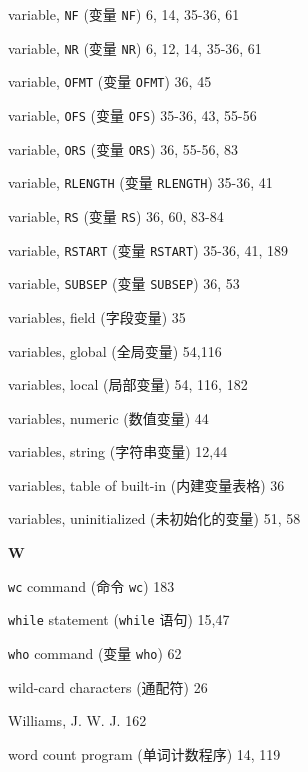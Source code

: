 \begin{multicols}{2}
\hangindent=2pc  variable, \verb'NF' (变量 \verb'NF')
6, 14, 35-36, 61

\hangindent=2pc  variable, \verb'NR' (变量 \verb'NR')
6, 12, 14, 35-36, 61

\hangindent=2pc  variable, \verb'OFMT' (变量 \verb'OFMT') 36, 45

\hangindent=2pc  variable, \verb'OFS' (变量 \verb'OFS')
35-36, 43, 55-56

\hangindent=2pc  variable, \verb'ORS' (变量 \verb'ORS') 36, 55-56, 83

\hangindent=2pc  variable, \verb'RLENGTH' (变量 \verb'RLENGTH')
35-36, 41

\hangindent=2pc  variable, \verb'RS' (变量 \verb'RS') 36, 60, 83-84

\hangindent=2pc  variable, \verb'RSTART' (变量 \verb'RSTART')
35-36, 41, 189

\hangindent=2pc  variable, \verb'SUBSEP' (变量 \verb'SUBSEP') 36, 53

\hangindent=2pc  variables, field (字段变量) 35

\hangindent=2pc  variables, global (全局变量) 54,116

\hangindent=2pc  variables, local (局部变量) 54, 116, 182

\hangindent=2pc  variables, numeric (数值变量) 44

\hangindent=2pc  variables, string (字符串变量) 12,44

\hangindent=2pc  variables, table of built-in (内建变量表格) 36

\hangindent=2pc  variables, uninitialized (未初始化的变量) 51, 58

\medskip\textbf{\large{W}}

\hangindent=2pc  \verb'wc' command (命令 \verb'wc') 183

\hangindent=2pc  \verb'while' statement (\verb'while' 语句) 15,47

\hangindent=2pc  \verb'who' command (变量 \verb'who') 62

\hangindent=2pc  wild-card characters (通配符) 26

\hangindent=2pc  Williams, J. W. J. 162

\hangindent=2pc  word count program (单词计数程序) 14, 119


\end{multicols}
